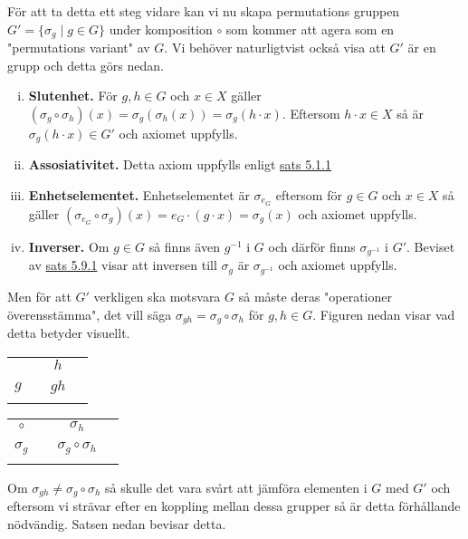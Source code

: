\documentclass{article}
\theoremstyle{definition}
\begin{document}
För att ta detta ett steg vidare kan vi nu skapa permutations gruppen 
$G' = \{\sigma_g \; | \; g \in G\}$ under komposition $\circ$ som kommer att agera som 
en "permutations variant" av $G$. Vi behöver naturligtvist också visa att $G'$ är en grupp
och detta görs nedan. 
\begin{enumerate}[(i)]
  \item \textbf{Slutenhet.} För $g, h \in G$ och $x \in X$ gäller 
  $(\sigma_g \circ \sigma_h) (x) = \sigma_g(\sigma_h(x)) = \sigma_g(h \cdot x)$. Eftersom 
  $h \cdot x \in X$ så är $\sigma_g(h \cdot x) \in G'$ och axiomet uppfylls.
  \item \textbf{Assosiativitet.} Detta axiom uppfylls enligt \hyperlink{ass}{sats 5.1.1}
  \item \textbf{Enhetselementet.} Enhetselementet är $\sigma_{e_G}$ eftersom för 
  $g \in G$ och $x \in X$ så gäller $(\sigma_{e_G} \circ \sigma_g) (x) = 
  e_G \cdot (g \cdot x) = \sigma_g(x)$ och axiomet uppfylls. 
  \item \textbf{Inverser.} Om $g \in G$ så finns även $g^{-1}$ i $G$ och därför finns 
  $\sigma_{g^{-1}}$ i $G'$. Beviset av \hyperlink{sats4.9.1}{sats 5.9.1} visar 
  att inversen till $\sigma_g$ är $\sigma_{g^{-1}}$ och axiomet uppfylls. 
\end{enumerate}
Men för att $G'$ verkligen ska motsvara $G$ så måste deras "operationer överensstämma", det 
vill säga $\sigma_{gh} = \sigma_g \circ \sigma_h$ för $g, h \in G$.
Figuren nedan visar vad detta betyder visuellt.

\begin{center}{}
  \begin{tabular}{c | c c c}
     &  & $h$ &\\
    \cline{1-4}
    &  &  & \\
    $g$ &  & $gh$ & \\
    &  &  & \\
  \end{tabular} 
  \quad
  \quad
  \begin{tabular}{c | c c c}
    $\circ$ &  & $\sigma_h$ &\\
    \cline{1-4}
    &  &  & \\
    $\sigma_g$ &  & $\sigma_g \circ \sigma_h$ & \\
    &  &  & \\
  \end{tabular} 
\end{center}
Om $\sigma_{gh} \neq \sigma_g \circ \sigma_h$ så skulle det vara svårt att jämföra elementen i 
$G$ med $G'$ och eftersom vi strävar efter en koppling mellan dessa grupper så
är detta förhållande nödvändig. Satsen nedan bevisar detta. 
\end{document}
